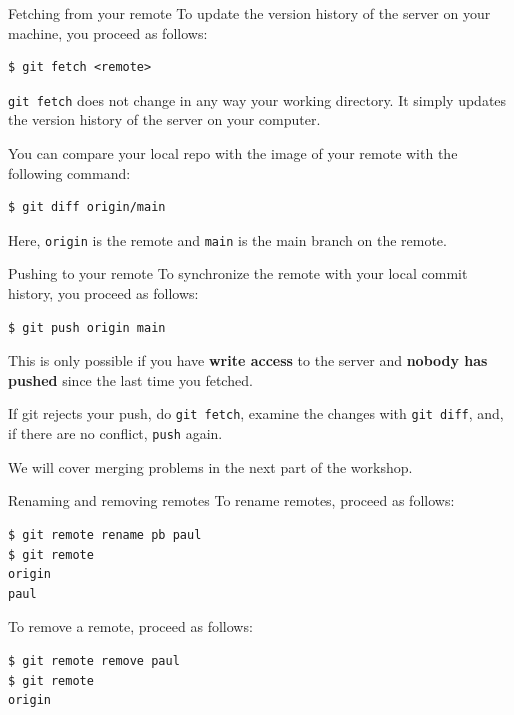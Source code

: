 \documentclass[handout]{beamer}
\begin{document}
\begin{frame}[fragile]{Fetching from your remote}
To update the version history of the server on your machine, you proceed as follows: 
\begin{lstlisting}
$ git fetch <remote>
\end{lstlisting}
\texttt{git fetch} does not change in any way your working directory. It simply updates the version history of the server on your computer. 

\vspace{0.5cm}

You can compare your local repo with the image of your remote with  the following command:

\begin{lstlisting}
$ git diff origin/main
\end{lstlisting}

Here, \texttt{origin} is the remote and \texttt{main} is the main branch on the remote. 

\end{frame}

\begin{frame}[fragile]{Pushing to your remote}
To synchronize the remote with your local commit history, you proceed as follows: 
\begin{lstlisting}
$ git push origin main
\end{lstlisting}

This is only possible if you have \textbf{write access} to the server and \textbf{nobody has pushed} since the last time you fetched. 

\vspace{0.5cm}

If git rejects your push, do \texttt{git fetch}, examine the changes with \texttt{git diff}, and,  if there are no conflict, \texttt{push} again. 

\vspace{0.5cm}

We will cover merging problems in the next part of the workshop. 

\end{frame}


\begin{frame}[fragile]{Renaming and removing remotes}
To rename remotes, proceed as follows: 
\begin{lstlisting}
$ git remote rename pb paul
$ git remote
origin
paul
\end{lstlisting}
To remove a remote, proceed as follows: 
\begin{lstlisting}
$ git remote remove paul
$ git remote
origin
\end{lstlisting} 

\end{frame}
\end{document}
